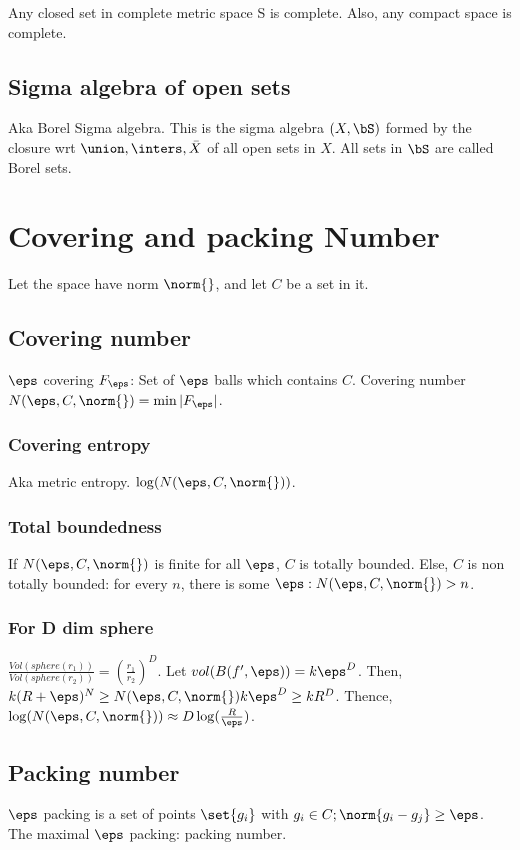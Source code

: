 \documentclass[oneside, article]{memoir}
\begin{document}
Any closed set in complete metric space S is complete. Also, any compact space is complete.

\subsection{Sigma algebra of open sets}
Aka Borel Sigma algebra. This is the sigma algebra $(X, \bS)$ formed by the closure wrt $\union, \inters, \bar{X}$ of all open sets in $X$. All sets in $\bS$ are called Borel sets.

\section{Covering and packing Number}
Let the space have norm $\norm{}$, and let $C$ be a set in it.

\subsection{Covering number }
$\eps$ covering $F_\eps$: Set of $\eps$ balls which contains $C$. Covering number $N(\eps, C, \norm{}) = \min |F_\eps|$.

\subsubsection{Covering entropy}
Aka metric entropy. $\log (N(\eps, C, \norm{}))$.

\subsubsection{Total boundedness}
If $N(\eps, C, \norm{})$ is finite for all $\eps$, $C$ is totally bounded. Else, $C$ is non totally bounded: for every $n$, there is some $\eps: N(\eps, C, \norm{}) > n$.

\subsubsection{For D dim sphere}
$\frac{Vol(sphere(r_1))}{Vol(sphere(r_2))} = (\frac{r_1}{r_2})^D$. Let $vol(B(f', \eps)) = k \eps^{D}$. Then, \\
$k(R+ \eps)^{N} \geq N(\eps, C, \norm{})k \eps^{D} \geq kR^{D}$. Thence, $\log (N(\eps, C, \norm{})) \approx D \log(\frac{R}{\eps})$.

\subsection{Packing number }
$\eps$ packing is a set of points $\set{g_i}$ with $g_i\in C; \norm{g_i - g_j} \geq \eps$. The maximal $\eps$ packing: packing number.
\end{document}
